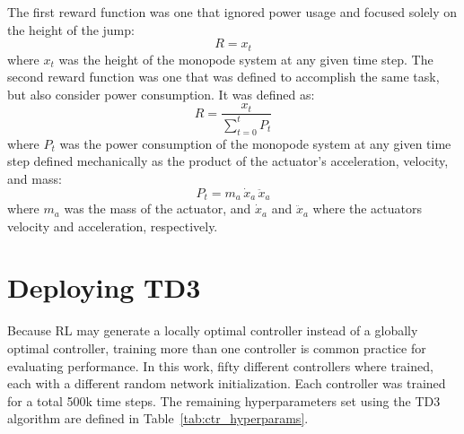 The first reward function was one that ignored power usage and focused solely on the height of the jump:
% 
\begin{equation}
    \label{eq:rewardHeight}
    R = x_t
\end{equation}
% 
where $x_t$ was the height of the monopode system at any given time step. The second reward function was one that was defined to accomplish the same task, but also consider power consumption. It was defined as:
% 
\begin{equation}
    \label{eq:rewardEfficiency}
    R = \frac{x_t}{\sum_{t=0}^{t} P_t}
\end{equation}
% 
where $P_t$ was the power consumption of the monopode system at any given time step defined mechanically as the product of the actuator's acceleration, velocity, and mass:
%
\begin{equation}
    \label{eq:power}
    P_t = m_a\,\dot{x}_a\,\ddot{x}_a
\end{equation}
%
where $m_a$ was the mass of the actuator, and $\dot{x}_a$ and $\ddot{x}_a$ where the actuators velocity and acceleration, respectively. 

\section{Deploying TD3}
% 
Because RL may generate a locally optimal controller instead of a globally optimal controller, training more than one controller is common practice for evaluating performance. In this work, fifty different controllers where trained, each with a different random network initialization. Each controller was trained for a total 500k time steps. The remaining hyperparameters set using the TD3 algorithm are defined in Table~\ref{tab:ctr_hyperparams}.

